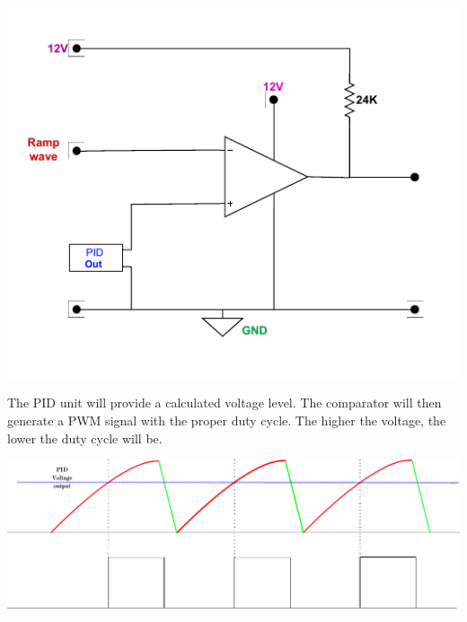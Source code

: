 \begin{multicols}{2}
\begin{minipage}{0.45\textwidth}
\centering
\includegraphics[width=\textwidth]{Method/PWM width controller circuit.pdf}
\end{minipage}

The PID unit will provide a calculated voltage level. The comparator will then generate a PWM signal with the proper duty cycle. The higher the voltage, the lower the duty cycle will be.


\begin{minipage}{0.45\textwidth}
\centering
\includegraphics[width=\textwidth]{Method/PWM Genration from ramp graph.pdf}
\end{minipage}


\end{multicols}
